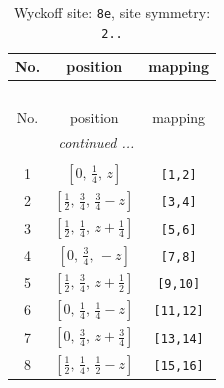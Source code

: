\documentclass[fleqn,8pt]{jsarticle}
\begin{document}
\begin{longtable}{ccc}
\caption{Wyckoff site: {\tt 8e}, site symmetry: {\tt 2..}}
 \\
 \hline \hline
No. & position & mapping \\ \hline \endfirsthead

\multicolumn{2}{l}{\tablename\ \thetable{}} \\
 \hline \hline
No. & position & mapping \\ \hline \endhead

 \hline \hline
\multicolumn{2}{r}{\footnotesize\it continued ...} \\ \endfoot

 \hline \hline
\multicolumn{2}{r}{} \\ \endlastfoot

1 & $\left[ 0,\, \frac{1}{4},\, z \right]$ & {\tt [1,2]} \\ \hline
2 & $\left[ \frac{1}{2},\, \frac{3}{4},\, \frac{3}{4} - z \right]$ & {\tt [3,4]} \\ \hline
3 & $\left[ \frac{1}{2},\, \frac{1}{4},\, z + \frac{1}{4} \right]$ & {\tt [5,6]} \\ \hline
4 & $\left[ 0,\, \frac{3}{4},\, - z \right]$ & {\tt [7,8]} \\ \hline
5 & $\left[ \frac{1}{2},\, \frac{3}{4},\, z + \frac{1}{2} \right]$ & {\tt [9,10]} \\ \hline
6 & $\left[ 0,\, \frac{1}{4},\, \frac{1}{4} - z \right]$ & {\tt [11,12]} \\ \hline
7 & $\left[ 0,\, \frac{3}{4},\, z + \frac{3}{4} \right]$ & {\tt [13,14]} \\ \hline
8 & $\left[ \frac{1}{2},\, \frac{1}{4},\, \frac{1}{2} - z \right]$ & {\tt [15,16]} \\
\end{longtable}
\renewcommand{\arraystretch}{1.2}
\end{document}
